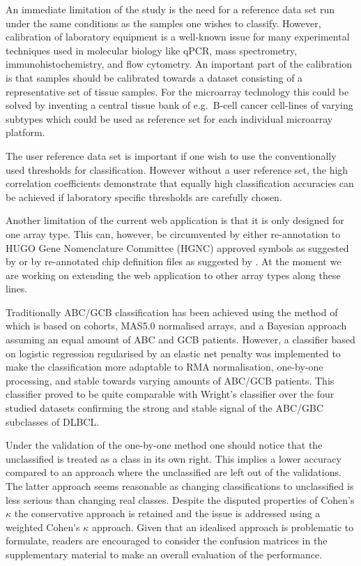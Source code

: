 \documentclass{article}
\begin{document}
An immediate limitation of the study is the need for a reference data set run under the same conditions as the samples one wishes to classify.
However, calibration of laboratory equipment is a well-known issue for many experimental techniques used in molecular biology like qPCR, mass spectrometry, immunohistochemistry, and flow cytometry.
An important part of the calibration is that samples should be calibrated towards a dataset consisting of a representative set of tissue samples.
For the microarray technology this could be solved by inventing a central tissue bank of e.g.\ B-cell cancer cell-lines of varying subtypes which could be used as reference set for each individual microarray platform.

The user reference data set is important if one wish to use the conventionally used thresholds for classification.
However without a user reference set, the high correlation coefficients demonstrate that equally high classification accuracies can be achieved if laboratory specific thresholds are carefully chosen.

Another limitation of the current web application is that it is only designed for one array type.
This can, however, be circumvented by either re-annotation to HUGO Gene Nomenclature Committee (HGNC) approved symbols as suggested by \citet{Care2013} or by re-annotated chip definition files as suggested by \citep{Dai2005}.
At the moment we are working on extending the web application to other array types along these lines.

Traditionally ABC/GCB classification has been achieved using the method of \citet{Wright2003} which is based on cohorts, MAS5.0 normalised arrays, and a Bayesian approach assuming an equal amount of ABC and GCB patients.
However, a classifier based on logistic regression regularised by an elastic net penalty was implemented to make the classification more adaptable to RMA normalisation, one-by-one processing, and stable towards varying amounts of ABC/GCB patients.
This classifier proved to be quite comparable with Wright's classifier over the four studied datasets confirming the strong and stable signal of the ABC/GBC subclasses of DLBCL.

Under the validation of the one-by-one method one should notice that the unclassified is treated as a class in its own right.
This implies a lower accuracy compared to an approach where the unclassified are left out of the validations.
The latter approach seems reasonable as changing classifications to unclassified is less serious than changing real classes.
Despite the disputed properties of Cohen's $\kappa$ the conservative approach is retained and the issue is addressed using a weighted Cohen's $\kappa$ approach.
Given that an idealised approach is problematic to formulate, readers are encouraged to consider the confusion matrices in the supplementary material to make an overall evaluation of the performance.
\end{document}
